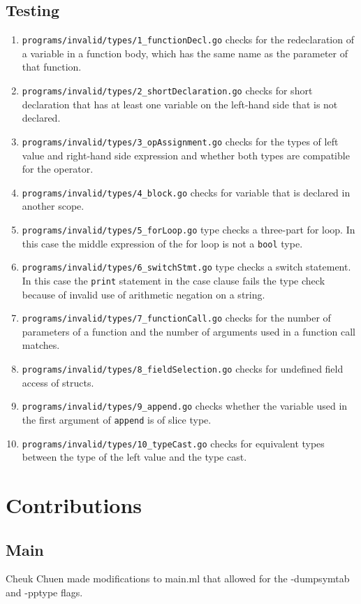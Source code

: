 \documentclass{article}
\begin{document}
\subsection*{Testing}
\begin{enumerate}
	\item \verb|programs/invalid/types/1_functionDecl.go| checks for the redeclaration of a variable in a function body, which has the same name as the parameter of that function.
	\item \verb|programs/invalid/types/2_shortDeclaration.go| checks for short declaration that has at least one variable on the left-hand side that is not declared.
	\item \verb|programs/invalid/types/3_opAssignment.go| checks for the types of left value and right-hand side expression and whether both types are compatible for the operator.
	\item \verb|programs/invalid/types/4_block.go| checks for variable that is declared in another scope.
	\item \verb|programs/invalid/types/5_forLoop.go| type checks a three-part for loop. In this case the middle expression of the for loop is not a \verb|bool| type.
	\item \verb|programs/invalid/types/6_switchStmt.go| type checks a switch statement. In this case the \verb|print| statement in the case clause fails the type check because of invalid use of arithmetic negation on a string.
	\item \verb|programs/invalid/types/7_functionCall.go| checks for the number of parameters of a function and the number of arguments used in a function call matches.
	\item \verb|programs/invalid/types/8_fieldSelection.go| checks for undefined field access of structs.
	\item \verb|programs/invalid/types/9_append.go| checks whether the variable used in the first argument of \verb|append| is of slice type.
	\item \verb|programs/invalid/types/10_typeCast.go| checks for equivalent types between the type of the left value and the type cast.
\end{enumerate}
\hfill

\section*{Contributions}
\subsection*{Main}
Cheuk Chuen made modifications to main.ml that allowed for the -dumpsymtab and -pptype flags.
\end{document}

